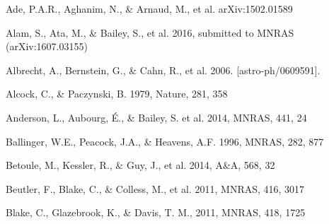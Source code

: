 \documentclass[iop]{emulateapj}
\begin{document}
\begin{thebibliography}{}

Ade, P.A.R., Aghanim, N., \& Arnaud, M., et al. arXiv:1502.01589

Alam, S., Ata, M., \& Bailey, S., et al. 2016,
submitted to MNRAS (arXiv:1607.03155)

Albrecht, A., Bernstein, G., \& Cahn, R., et al. 2006. [astro-ph/0609591].



Alcock, C., \& Paczynski, B. 1979, Nature, 281, 358  


Anderson, L., Aubourg, \'E., \& Bailey, S. et al. 2014, MNRAS, 441, 24  
  

Ballinger, W.E., Peacock, J.A., \& Heavens, A.F. 1996, MNRAS, 282, 877  

Betoule, M., Kessler, R., \& Guy, J., et al. 2014, A\&A, 568, 32


Beutler, F., Blake, C., \& Colless, M., et al. 2011, MNRAS, 416, 3017



Blake, C., Glazebrook, K., \& Davis, T. M., 2011, MNRAS, 418, 1725  




\end{thebibliography}
\end{document}
